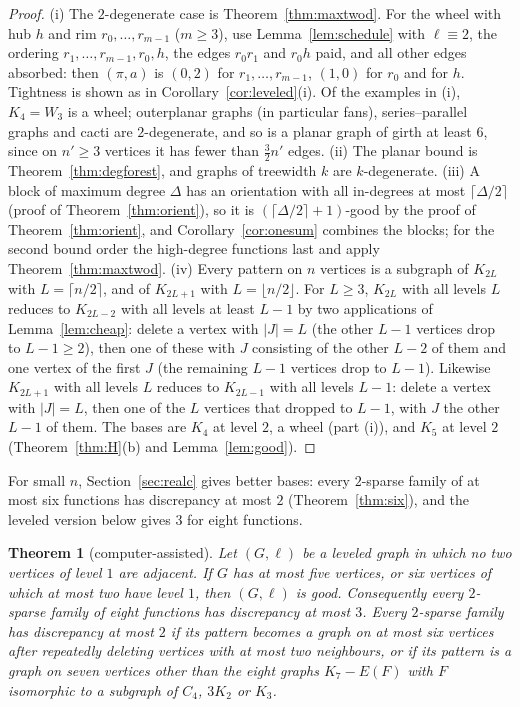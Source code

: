 \documentclass[11pt,letterpaper]{article}
\newtheorem{theorem}{Theorem}[section]
\theoremstyle{definition}
\begin{document}
\begin{proof}
(i) The $2$-degenerate case is Theorem~\ref{thm:maxtwod}. For the wheel with hub $h$ and rim
$r_0,\dots,r_{m-1}$ ($m\ge3$), use Lemma~\ref{lem:schedule} with $\ell\equiv2$, the ordering
$r_1,\dots,r_{m-1},r_0,h$, the edges $r_0r_1$ and $r_0h$ paid, and all other edges absorbed: then
$(\pi,a)$ is $(0,2)$ for $r_1,\dots,r_{m-1}$, $(1,0)$ for $r_0$ and for $h$. Tightness is shown as in
Corollary~\ref{cor:leveled}(i).
Of the examples in (i), $K_4=W_3$ is a wheel; outerplanar graphs (in particular fans),
series--parallel graphs and cacti are $2$-degenerate, and so is a planar graph of girth at least $6$,
since on $n'\ge3$ vertices it has fewer than $\frac32n'$ edges.
(ii) The planar bound is Theorem~\ref{thm:degforest}, and graphs of treewidth $k$ are $k$-degenerate.
(iii) A block of maximum degree $\Delta$ has an orientation with all in-degrees at most
$\lceil\Delta/2\rceil$ (proof of Theorem~\ref{thm:orient}), so it is $(\lceil\Delta/2\rceil+1)$-good by
the proof of Theorem~\ref{thm:orient}, and Corollary~\ref{cor:onesum} combines the blocks; for the
second bound order the high-degree functions last and apply Theorem~\ref{thm:maxtwod}.
(iv) Every pattern on $n$ vertices is a subgraph of $K_{2L}$ with $L=\lceil n/2\rceil$, and of
$K_{2L+1}$ with $L=\lfloor n/2\rfloor$. For $L\ge3$, $K_{2L}$ with all levels $L$ reduces to $K_{2L-2}$
with all levels at least $L-1$ by two applications of Lemma~\ref{lem:cheap}: delete a vertex with $|J|=L$
(the other $L-1$ vertices drop to $L-1\ge2$), then one of these with $J$ consisting of the other $L-2$ of
them and one vertex of the first $J$ (the remaining $L-1$ vertices drop to $L-1$). Likewise $K_{2L+1}$ with
all levels $L$ reduces to $K_{2L-1}$ with all levels $L-1$: delete a vertex with $|J|=L$, then one of the
$L$ vertices that dropped to $L-1$, with $J$ the other $L-1$ of them. The bases are $K_4$ at level $2$, a
wheel (part (i)), and $K_5$ at level $2$ (Theorem~\ref{thm:H}(b) and Lemma~\ref{lem:good}).
\end{proof}

For small $n$, Section~\ref{sec:realc} gives better bases: every $2$-sparse family of at most six
functions has discrepancy at most $2$ (Theorem~\ref{thm:six}), and the leveled version below gives $3$
for eight functions.

\begin{theorem}[computer-assisted]\label{thm:leveledsmall}
Let $(G,\ell)$ be a leveled graph in which no two vertices of level $1$ are adjacent. If $G$ has at most
five vertices, or six vertices of which at most two have level $1$, then $(G,\ell)$ is good.
Consequently every $2$-sparse family of eight functions has discrepancy at most $3$. Every $2$-sparse
family has discrepancy at most $2$ if its pattern becomes a graph on at most six vertices after
repeatedly deleting vertices with at most two neighbours, or if its pattern is a graph on seven
vertices other than the eight graphs $K_7-E(F)$ with $F$ isomorphic to a subgraph of $C_4$, $3K_2$ or
$K_3$.
\end{theorem}
\end{document}
